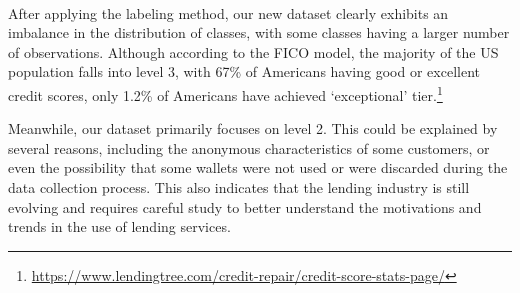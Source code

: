 \documentclass[../ICIT-Paper-2024.tex]{subfiles}
\begin{document}
\paragraph{}
After applying the labeling method, our new dataset clearly exhibits an imbalance in the distribution of classes, with some classes having a larger number of observations. Although according to the FICO model, the majority of the US population falls into level 3, with 67\% of Americans having good or excellent credit scores, only 1.2\% of Americans have achieved ‘exceptional’ tier.\footnote{\href{https://www.lendingtree.com/credit-repair/credit-score-stats-page/}{https://www.lendingtree.com/credit-repair/credit-score-stats-page/}}

Meanwhile, our dataset primarily focuses on level 2. This could be explained by several reasons, including the anonymous characteristics of some customers, or even the possibility that some wallets were not used or were discarded during the data collection process. This also indicates that the lending industry is still evolving and requires careful study to better understand the motivations and trends in the use of lending services.

\end{document}
